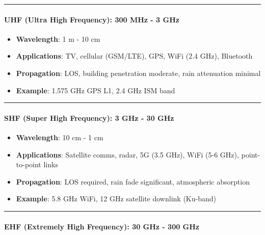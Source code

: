 \begin{center}\rule{0.5\linewidth}{0.5pt}\end{center}

\paragraph{\texorpdfstring{\textbf{UHF (Ultra High Frequency): 300 MHz -
3
GHz}}{UHF (Ultra High Frequency): 300 MHz - 3 GHz}}\label{uhf-ultra-high-frequency-300-mhz---3-ghz}

\begin{itemize}
\tightlist
\item
  \textbf{Wavelength}: 1 m - 10 cm
\item
  \textbf{Applications}: TV, cellular (GSM/LTE), GPS, WiFi (2.4 GHz),
  Bluetooth
\item
  \textbf{Propagation}: LOS, building penetration moderate, rain
  attenuation minimal
\item
  \textbf{Example}: 1.575 GHz GPS L1, 2.4 GHz ISM band
\end{itemize}

\begin{center}\rule{0.5\linewidth}{0.5pt}\end{center}

\paragraph{\texorpdfstring{\textbf{SHF (Super High Frequency): 3 GHz -
30
GHz}}{SHF (Super High Frequency): 3 GHz - 30 GHz}}\label{shf-super-high-frequency-3-ghz---30-ghz}

\begin{itemize}
\tightlist
\item
  \textbf{Wavelength}: 10 cm - 1 cm
\item
  \textbf{Applications}: Satellite comms, radar, 5G (3.5 GHz), WiFi (5-6
  GHz), point-to-point links
\item
  \textbf{Propagation}: LOS required, rain fade significant, atmospheric
  absorption
\item
  \textbf{Example}: 5.8 GHz WiFi, 12 GHz satellite downlink (Ku-band)
\end{itemize}

\begin{center}\rule{0.5\linewidth}{0.5pt}\end{center}

\paragraph{\texorpdfstring{\textbf{EHF (Extremely High Frequency): 30
GHz - 300
GHz}}{EHF (Extremely High Frequency): 30 GHz - 300 GHz}}\label{ehf-extremely-high-frequency-30-ghz---300-ghz}

